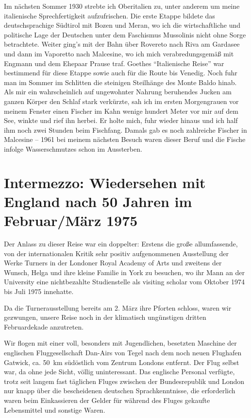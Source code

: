 \documentclass[a5paper,pagesize,10pt,twoside=true]{scrbook}
\renewcommand{\marginpar}[2][]{}
\begin{document}
Im nächsten Sommer 1930 strebte ich Oberitalien zu, unter anderem um meine italienische Sprechfertigkeit aufzufrischen. Die erste Etappe bildete das deutschsprachige Südtirol mit Bozen und Meran, wo ich die wirtschaftliche und politische Lage der Deutschen unter dem Faschismus Mussolinis nicht ohne Sorge betrachtete. Weiter ging's mit der Bahn über Rovereto nach Riva am Gardasee und dann im Vaporetto nach Malcesine, wo ich mich verabredungsgemäß mit Engmann und dem Ehepaar Prause traf. Goethes \enquote{Italienische Reise} war bestimmend für diese Etappe sowie auch für die Route bis Venedig. Noch fuhr man im Sommer im Schlitten die steinigen Steilhänge des Monte Baldo hinab. Als mir ein wahrscheinlich auf ungewohnter Nahrung beruhendes Jucken am ganzen Körper den Schlaf stark verkürzte, sah ich im ersten Morgengrauen vor meinem Fenster einen Fischer im Kahn wenige hundert Meter vor mir auf dem See, winkte und rief ihn herbei. Er holte mich, fuhr wieder hinaus und ich half ihm noch zwei Stunden beim Fischfang. Damals gab es noch zahlreiche Fischer in Malcesine -- 1961 bei meinem nächsten Besuch waren dieser Beruf und die Fische infolge Wasserschmutzes schon im Aussterben.

\marginpar{15.7.03}

\section{Intermezzo: Wiedersehen mit England nach 50 Jahren im Februar/März 1975}
Der Anlass zu dieser Reise war ein doppelter: Erstens die große allumfassende, von der internationalen Kritik sehr positiv aufgenommenen Ausstellung der Werke Turners in der Londoner Royal Academy of Arts und zweitens der Wunsch, Helga und ihre kleine Familie in York zu besuchen, wo ihr Mann an der University eine nichtbezahlte Studienstelle als visiting scholar vom Oktober 1974 bis Juli 1975 innehatte.

Da die Turnerausstellung bereits am 2. März ihre Pforten schloss, waren wir gezwungen, unsere Reise noch in der klimatisch ungünstigen dritten Februardekade anzutreten.

Wir flogen mit einer voll, besonders mit Jugendlichen, besetzten Maschine der englischen Fluggesellschaft Dan-Airs von Tegel nach dem noch neuen Flughafen Gatwick, ca. 50~km südöstlich vom Zentrum Londons entfernt. Der Flug selbst war, da ohne jede Sicht, völlig uninteressant. Das englische Personal verfügte, trotz seit langem fast täglichen Fluges zwischen der Bundesrepublik und London nur knapp über die bescheidenen deutschen Sprachkenntnisse, die erforderlich waren beim Einkassieren der Gelder für während des Fluges gekaufte Lebensmittel und sonstige Waren.
\end{document}
